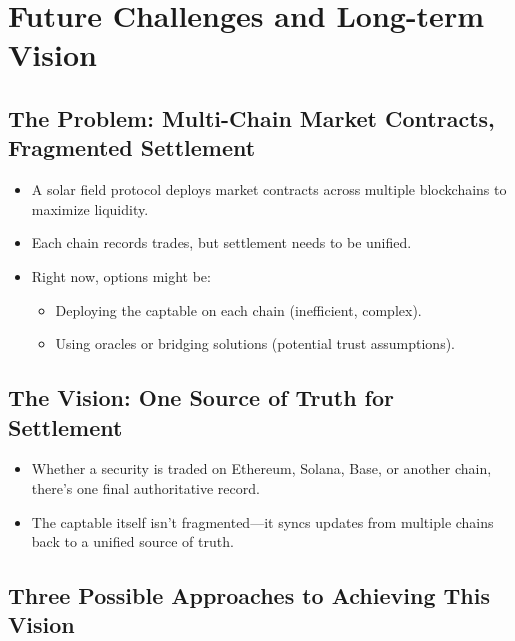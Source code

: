 \documentclass[11pt,a4paper]{article}
\begin{document}
\section{Future Challenges and Long-term Vision}

\subsection{The Problem: Multi-Chain Market Contracts, Fragmented Settlement}
\begin{itemize}
    \item A solar field protocol deploys market contracts across multiple blockchains to maximize liquidity.
    \item Each chain records trades, but settlement needs to be unified.
    \item Right now, options might be:
    \begin{itemize}
        \item Deploying the captable on each chain (inefficient, complex).
        \item Using oracles or bridging solutions (potential trust assumptions).
    \end{itemize}
\end{itemize}

\subsection{The Vision: One Source of Truth for Settlement}
\begin{itemize}
    \item Whether a security is traded on Ethereum, Solana, Base, or another chain, there's one final authoritative record.
    \item The captable itself isn't fragmented---it syncs updates from multiple chains back to a unified source of truth.
\end{itemize}

\subsection{Three Possible Approaches to Achieving This Vision}
\end{document}
